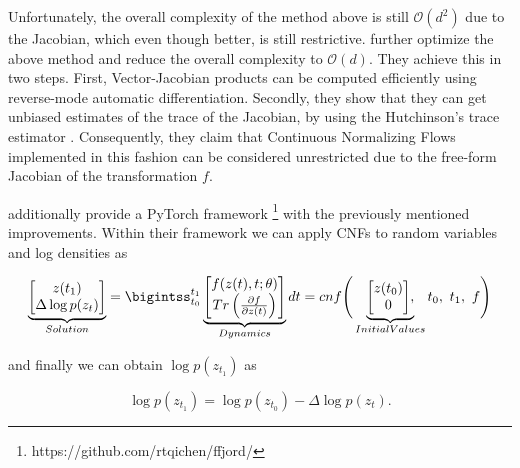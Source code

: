Unfortunately, the overall complexity of the method above is still $ \mathcal{O}(d^2) $ due to the Jacobian, which even though better, is still restrictive. \citet{grathwohl2018ffjord} further optimize the above method and reduce the overall complexity to $ \mathcal{O}(d) $. They achieve this in two steps. First, Vector-Jacobian products can be computed efficiently using reverse-mode automatic differentiation. Secondly, they show that they can get unbiased estimates of the trace of the Jacobian, by using the Hutchinson’s trace estimator \citep{hutchinson1990stochastic}. Consequently, they claim that Continuous Normalizing Flows implemented in this fashion can be considered unrestricted due to the free-form Jacobian of the transformation $ f $.


\citet{grathwohl2018ffjord} additionally provide a PyTorch framework \footnote{https://github.com/rtqichen/ffjord/} with the previously mentioned improvements. Within their framework we can apply CNFs to random variables and log densities as

\begin{displaymath}
    \underbrace{
        \begin{matrix}
            \begin{bmatrix}
                z(t_1) \\
                \Delta \log p(z_t) %
            \end{bmatrix}
        \end{matrix}
    }_{Solution}
    =
        \bigintss_{t_0}^{t_1}
        \underbrace{
            \begin{matrix}
                \begin{bmatrix}
                    f(z(t), t; \theta) \\
                    Tr \left ( \frac{\partial f}{\partial z(t)} \right)
                \end{bmatrix}
            \end{matrix}
    }_{Dynamics}
    dt = cnf
    \Bigg (
        \underbrace{
            \begin{matrix}
                \begin{bmatrix}
                    z(t_0) \\
                    0
                \end{bmatrix}
            \end{matrix},
        }_{Initial Values}
        t_0, \ t_1, \ f
    \Bigg )
\end{displaymath}

and finally we can obtain $ \log p(z_{t_1}) $  as 

\begin{displaymath}
    \log p(z_{t_1}) = \log p(z_{t_0}) - \Delta \log p(z_t).
\end{displaymath}
